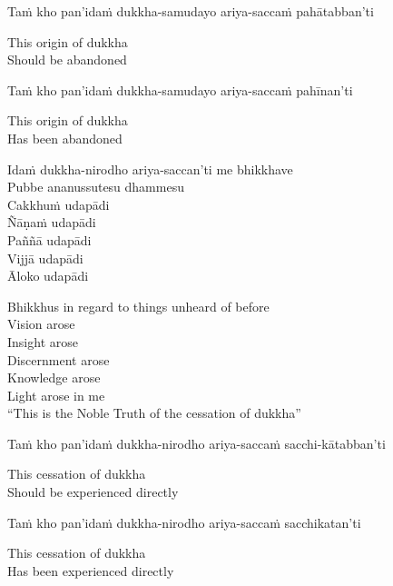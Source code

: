 Taṁ kho pan'idaṁ dukkha-samudayo ariya-saccaṁ pahātabban'ti

\begin{english}
  This origin of dukkha\\
  Should be abandoned
\end{english}

Taṁ kho pan'idaṁ dukkha-samudayo ariya-saccaṁ pahīnan'ti

\begin{english}
  This origin of dukkha\\
  Has been abandoned
\end{english}

Idaṁ dukkha-nirodho ariya-saccan'ti me bhikkhave\\
Pubbe ananussutesu dhammesu\\
Cakkhuṁ udapādi\\
Ñāṇaṁ udapādi\\
Paññā udapādi\\
Vijjā udapādi\\
Āloko udapādi

\begin{english-verses}
  Bhikkhus in regard to things unheard of before\\
  Vision arose\\
  Insight arose\\
  Discernment arose\\
  Knowledge arose\\
  Light arose in me\\
  ``This is the Noble Truth of the cessation of dukkha''
\end{english-verses}

Taṁ kho pan'idaṁ dukkha-nirodho ariya-saccaṁ sacchi-kātabban'ti

\begin{english}
  This cessation of dukkha\\
  Should be experienced directly
\end{english}

\begin{pali-hang}
  Taṁ kho pan'idaṁ dukkha-nirodho ariya-saccaṁ sacchikatan'ti
\end{pali-hang}

\begin{english}
  This cessation of dukkha\\
  Has been experienced directly
\end{english}

